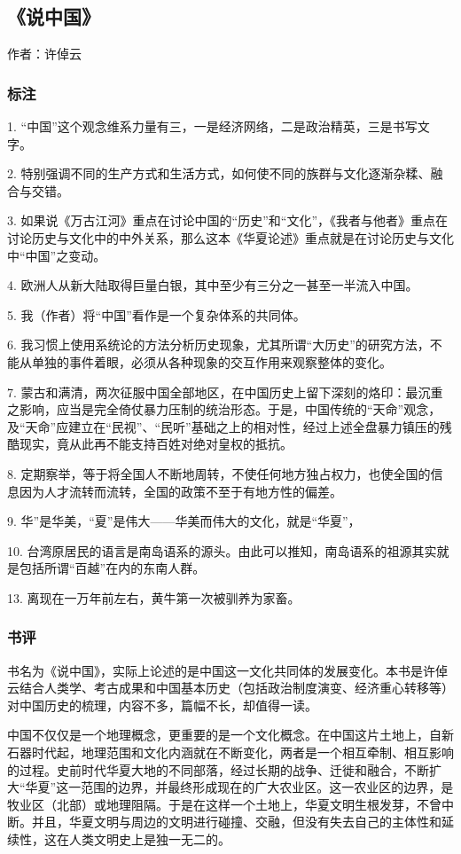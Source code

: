 \subsection{《说中国》}

作者：许倬云

\subsubsection{标注}

1. “中国”这个观念维系力量有三，一是经济网络，二是政治精英，三是书写文字。

2. 特别强调不同的生产方式和生活方式，如何使不同的族群与文化逐渐杂糅、融合与交错。

3. 如果说《万古江河》重点在讨论中国的“历史”和“文化”，《我者与他者》重点在讨论历史与文化中的中外关系，那么这本《华夏论述》重点就是在讨论历史与文化中“中国”之变动。

4. 欧洲人从新大陆取得巨量白银，其中至少有三分之一甚至一半流入中国。

5. 我（作者）将“中国”看作是一个复杂体系的共同体。

6. 我习惯上使用系统论的方法分析历史现象，尤其所谓“大历史”的研究方法，不能从单独的事件着眼，必须从各种现象的交互作用来观察整体的变化。

7. 蒙古和满清，两次征服中国全部地区，在中国历史上留下深刻的烙印：最沉重之影响，应当是完全倚仗暴力压制的统治形态。于是，中国传统的“天命”观念，及“天命”应建立在“民视”、“民听”基础之上的相对性，经过上述全盘暴力镇压的残酷现实，竟从此再不能支持百姓对绝对皇权的抵抗。

8. 定期察举，等于将全国人不断地周转，不使任何地方独占权力，也使全国的信息因为人才流转而流转，全国的政策不至于有地方性的偏差。

9. 华”是华美，“夏”是伟大——华美而伟大的文化，就是“华夏”，

10. 台湾原居民的语言是南岛语系的源头。由此可以推知，南岛语系的祖源其实就是包括所谓“百越”在内的东南人群。

13. 离现在一万年前左右，黄牛第一次被驯养为家畜。

\subsubsection{书评}

书名为《说中国》，实际上论述的是中国这一文化共同体的发展变化。本书是许倬云结合人类学、考古成果和中国基本历史（包括政治制度演变、经济重心转移等）对中国历史的梳理，内容不多，篇幅不长，却值得一读。

中国不仅仅是一个地理概念，更重要的是一个文化概念。在中国这片土地上，自新石器时代起，地理范围和文化内涵就在不断变化，两者是一个相互牵制、相互影响的过程。史前时代华夏大地的不同部落，经过长期的战争、迁徙和融合，不断扩大“华夏”这一范围的边界，并最终形成现在的广大农业区。这一农业区的边界，是牧业区（北部）或地理阻隔。于是在这样一个土地上，华夏文明生根发芽，不曾中断。并且，华夏文明与周边的文明进行碰撞、交融，但没有失去自己的主体性和延续性，这在人类文明史上是独一无二的。

